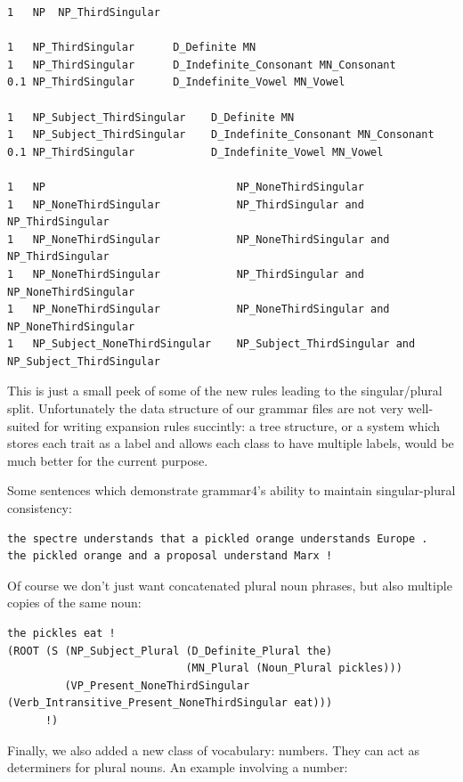\documentclass[11pt]{article}
\begin{document}
\begin{enumerate}
\begin{verbatim}
1   NP  NP_ThirdSingular

1   NP_ThirdSingular      D_Definite MN
1   NP_ThirdSingular      D_Indefinite_Consonant MN_Consonant
0.1 NP_ThirdSingular      D_Indefinite_Vowel MN_Vowel

1   NP_Subject_ThirdSingular    D_Definite MN
1   NP_Subject_ThirdSingular    D_Indefinite_Consonant MN_Consonant
0.1 NP_ThirdSingular            D_Indefinite_Vowel MN_Vowel

1   NP                              NP_NoneThirdSingular
1   NP_NoneThirdSingular            NP_ThirdSingular and NP_ThirdSingular
1   NP_NoneThirdSingular            NP_NoneThirdSingular and NP_ThirdSingular
1   NP_NoneThirdSingular            NP_ThirdSingular and NP_NoneThirdSingular
1   NP_NoneThirdSingular            NP_NoneThirdSingular and NP_NoneThirdSingular
1   NP_Subject_NoneThirdSingular    NP_Subject_ThirdSingular and NP_Subject_ThirdSingular
\end{verbatim}

      This is just a small peek of some of the new rules leading to the singular/plural split. Unfortunately the data structure of our grammar files are not very well-suited for writing expansion rules succintly: a tree structure, or a system which stores each trait as a label and allows each class to have multiple labels, would be much better for the current purpose.

      Some sentences which demonstrate grammar4's ability to maintain singular-plural consistency:

\begin{verbatim}
the spectre understands that a pickled orange understands Europe .
the pickled orange and a proposal understand Marx !
\end{verbatim}

      Of course we don't just want concatenated plural noun phrases, but also multiple copies of the same noun:

\begin{verbatim}
the pickles eat !
(ROOT (S (NP_Subject_Plural (D_Definite_Plural the)
                            (MN_Plural (Noun_Plural pickles)))
         (VP_Present_NoneThirdSingular (Verb_Intransitive_Present_NoneThirdSingular eat)))
      !)
\end{verbatim}

      Finally, we also added a new class of vocabulary: numbers. They can act as determiners for plural nouns. An example involving a number:


\end{enumerate}
\end{document}
